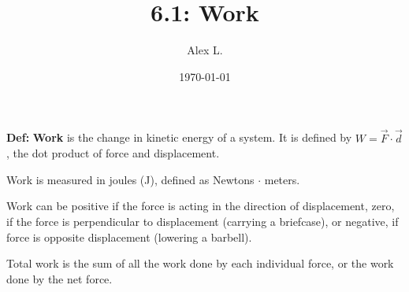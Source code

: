 \documentclass{article}
\title{6.1: Work}
\author{Alex L.}
\date{\today}
\begin{document}
\maketitle

\textbf{Def:} \textbf{Work} is the change in kinetic energy of a system. It is defined by $W = \vec{F} \cdot \vec{d}$, the dot product of force and displacement.

Work is measured in joules (J), defined as Newtons $\cdot$ meters. 

Work can be positive if the force is acting in the direction of displacement, zero, if the force is perpendicular to displacement (carrying a briefcase), or negative, if force is opposite displacement (lowering a barbell).

Total work is the sum of all the work done by each individual force, or the work done by the net force. 
\end{document}
